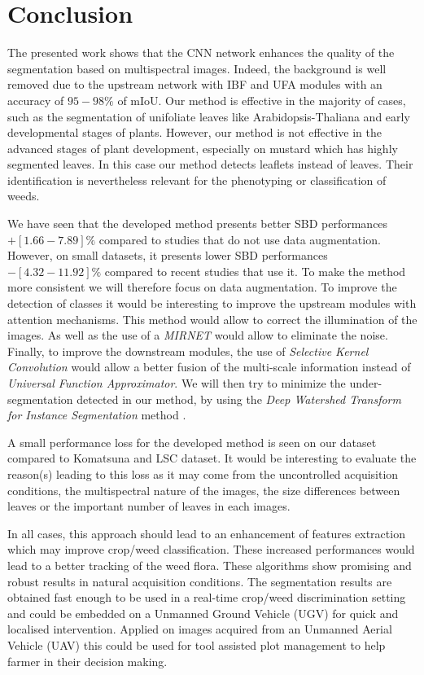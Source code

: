 \documentclass[../thesis.tex]{subfiles}
\begin{document}
    \section{Conclusion}
    
    The presented work shows that the CNN network enhances the quality of the segmentation based on multispectral images. Indeed, the background is well removed due to the upstream network with IBF and UFA modules with an accuracy of $95-98\%$ of mIoU. Our method is effective in the majority of cases, such as the segmentation of unifoliate leaves like Arabidopsis-Thaliana and early developmental stages of plants. However, our method is not effective in the advanced stages of plant development, especially on mustard which has highly segmented leaves. In this case our method detects leaflets instead of leaves. Their identification is nevertheless relevant for the phenotyping or classification of weeds.
    
    We have seen that the developed method presents better SBD performances $+[1.66-7.89]\%$ compared to studies that do not use data augmentation. However, on small datasets, it presents lower SBD performances $-[4.32-11.92]\%$ compared to recent studies that use it. To make the method more consistent we will therefore focus on data augmentation. To improve the detection of classes it would be interesting to improve the upstream modules with attention mechanisms. This method would allow to correct the illumination of the images. As well as the use of a \textit{MIRNET} \cite{Zamir2020MIRNet} would allow to eliminate the noise. Finally, to improve the downstream modules, the use of \textit{Selective Kernel Convolution} \cite{Zamir2020MIRNet} would allow a better fusion of the multi-scale information instead of \textit{Universal Function Approximator}. We will then try to minimize the under-segmentation detected in our method, by using the \textit{Deep Watershed Transform for Instance Segmentation} method \cite{8099788}.
    
    A small performance loss for the developed method is seen on our dataset compared to Komatsuna and LSC dataset. It would be interesting to evaluate the reason(s) leading to this loss as it may come from the uncontrolled acquisition conditions, the multispectral nature of the images, the size differences between leaves or the important number of leaves in each images.
    
    In all cases, this approach should lead to an enhancement of features extraction which may improve crop/weed classification. These increased performances would lead to a better tracking of the weed flora. These algorithms show promising and robust results in natural acquisition conditions. The segmentation results are obtained fast enough to be used in a real-time crop/weed discrimination setting and could be embedded on a Unmanned Ground Vehicle (UGV) for quick and localised intervention. Applied on images acquired from an Unmanned Aerial Vehicle (UAV) this could be used for tool assisted plot management to help farmer in their decision making.
    
\end{document}
